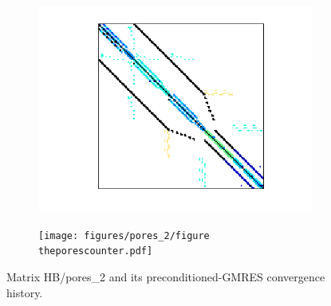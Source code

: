 \documentclass[twoside]{article}
\newcounter{fig}\setcounter{fig}{0}
\begin{document}
\begin{figure}[H]
  \centering
  \begin{subfigure}[t]{0.45\linewidth}
    \centering
    \includegraphics[width=1.1\linewidth]{figures/pores_2/matrix.png}
    \caption{}	
  \end{subfigure}
  \quad
  \begin{subfigure}[t]{0.45\linewidth}
    \centering
    \texttt{[image: figures/pores\_2/figure\\theporescounter.pdf]}

    \caption{}
  \end{subfigure}
  \caption{Matrix HB/pores_2 and its preconditioned-GMRES convergence history.}\label{fig:pores_2}	
\end{figure}
\end{document}

